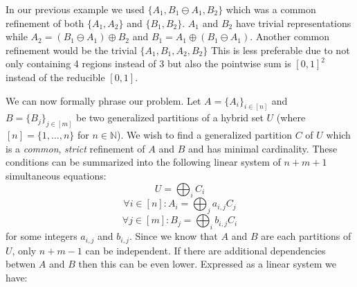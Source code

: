 In our previous example we used $\{ A_1, B_1 \ominus A_1, B_2 \}$ which was a common refinement of both
$\{ A_1, A_2 \}$ and $\{ B_1, B_2 \}$.
$A_1$ and $B_2$ have trivial representations while $A_2 = (B_1 \ominus A_1) \oplus B_2$ and 
$B_1 = A_1 \oplus (B_1 \ominus A_1)$.
Another common refinement would be the trivial $\{ A_1, B_1, A_2, B_2 \}$
This is less preferable due to not only containing 4 regions instead of 3 but also the pointwise sum is $[0,1]^2$
instead of the reducible $[0,1]$.

We can now formally phrase our problem.
Let $A=\{ A_i \}_{i \in [n]}$ and $B=\{ B_j \}_{j \in [m]}$ be two generalized partitions of a hybrid set $U$ 
(where $[n] = \{ 1, \ldots, n \}$ for $n \in \mathbb{N}$).
We wish to find a generalized partition $C$  of $U$ which is a \emph{common}, \emph{strict} refinement of $A$ and $B$
and has minimal cardinality.
These conditions can be summarized into the following linear system of $n+m+1$ simultaneous equations:
\begin{equation}
	U = \bigoplus_i C_i
\end{equation}
\begin{equation}
	\forall i \in [n] : A_i = \bigoplus_j  a_{i,j} C_j
\end{equation}
\begin{equation}
	\forall j \in [m] : B_j = \bigoplus_i b_{i,j} C_i
\end{equation}
for some integers $a_{i,j}$ and $b_{i,j}$.
Since we know that $A$ and $B$ are each partitions of $U$, only $n+m-1$ can be independent.
If there are additional dependencies betwen $A$ and $B$ then this can be even lower.
Expressed as a linear system we have:


